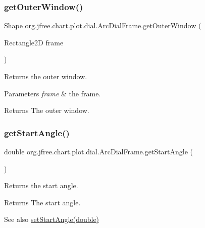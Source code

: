 \subsubsection{\texorpdfstring{get\+Outer\+Window()}{getOuterWindow()}}
{\footnotesize\ttfamily Shape org.\+jfree.\+chart.\+plot.\+dial.\+Arc\+Dial\+Frame.\+get\+Outer\+Window (\begin{DoxyParamCaption}\item[{Rectangle2D}]{frame }\end{DoxyParamCaption})\hspace{0.3cm}{\ttfamily [protected]}}

Returns the outer window.


\begin{DoxyParams}{Parameters}
{\em frame} & the frame.\\
\hline
\end{DoxyParams}
\begin{DoxyReturn}{Returns}
The outer window. 
\end{DoxyReturn}
\mbox{\label{classorg_1_1jfree_1_1chart_1_1plot_1_1dial_1_1_arc_dial_frame_ac58f374c79b5ded1b5c8048d0e5852d8}} 
\subsubsection{\texorpdfstring{get\+Start\+Angle()}{getStartAngle()}}
{\footnotesize\ttfamily double org.\+jfree.\+chart.\+plot.\+dial.\+Arc\+Dial\+Frame.\+get\+Start\+Angle (\begin{DoxyParamCaption}{ }\end{DoxyParamCaption})}

Returns the start angle.

\begin{DoxyReturn}{Returns}
The start angle.
\end{DoxyReturn}
\begin{DoxySeeAlso}{See also}
\mbox{\hyperlink{classorg_1_1jfree_1_1chart_1_1plot_1_1dial_1_1_arc_dial_frame_a0d44deb5dbd1be60ddeca18f1f82b0de}{set\+Start\+Angle(double)}} 
\end{DoxySeeAlso}
\mbox{\label{classorg_1_1jfree_1_1chart_1_1plot_1_1dial_1_1_arc_dial_frame_af33103b26b734123d651717a5e6068e3}} 
